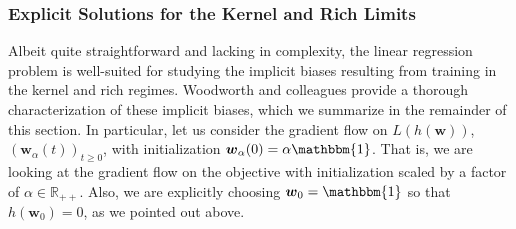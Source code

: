 \documentclass{article}
\begin{document}
\subsubsection{Explicit Solutions for the Kernel and Rich Limits}
Albeit quite straightforward and lacking in complexity, the linear regression problem is well-suited for studying the implicit biases resulting from training in the kernel and rich regimes. Woodworth and colleagues provide a thorough characterization of these implicit biases, which we summarize in the remainder of this section. In particular, let us consider the gradient flow on $L(h(\boldsymbol{w}))$, $(\boldsymbol{w}_{\alpha}(t))_{t \geq 0}$, with initialization $\boldsymbol{w}_{\alpha}(0) = \alpha \mathbbm{1}$. That is, we are looking at the gradient flow on the objective with initialization scaled by a factor of $\alpha \in \mathbb{R}_{++}$. Also, we are explicitly choosing $\boldsymbol{w}_0 = \mathbbm{1}$ so that $h(\boldsymbol{w}_0) = 0$, as we pointed out above.
\end{document}
